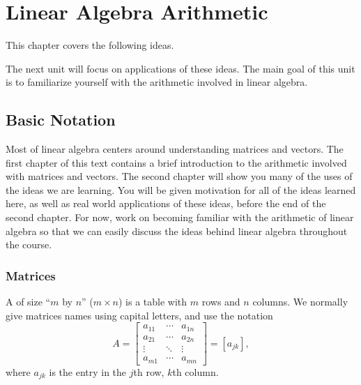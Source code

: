 
\chapter{Linear Algebra Arithmetic}

This chapter covers the following ideas. 



The next unit will focus on applications of these ideas. The main goal of this unit is to familiarize yourself with the arithmetic involved in linear algebra.

\section{Basic Notation}
Most of linear algebra centers around understanding matrices and vectors. The first chapter of this text contains a brief introduction to the arithmetic involved with matrices and vectors.  The second chapter will show you many of the uses of the ideas we are learning. You will be given motivation for all of the ideas learned here, as well as real world applications of these ideas, before the end of the second chapter.  For now, work on becoming familiar with the arithmetic of linear algebra so that we can easily discuss the ideas behind linear algebra throughout the course.


\subsection{Matrices}
A  of size ``{$m$} by {$n$}'' ($m\times n$) is a table
with {$m$} rows and {$n$} columns.  We normally give matrices names
using capital letters, and use the notation 
$$A = 
\begin{bmatrix}
a_{11}&\cdots&a_{1n}\\ 
a_{21}&\cdots&a_{2n}\\ 
\vdots&\ddots&\vdots\\ 
a_{m1}&\cdots&a_{mn} 
\end{bmatrix} 
= [a_{jk}],$$
where $a_{jk}$ is the entry in the $j$th row, $k$th column. 


